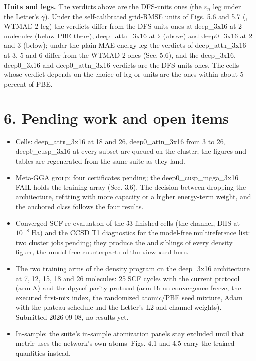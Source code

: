 \documentclass[10pt,a4paper]{article}
\begin{document}
\textbf{Units and legs.} The verdicts above are the DFS-units ones (the $\varepsilon_n$ leg under the Letter's $\gamma$). Under the self-calibrated grid-RMSE units of Figs. 5.6 and 5.7 (, WTMAD-2 leg) the verdicts differ from the DFS-units ones at deep\_3x16 at 2 molecules (below PBE there), deep\_attn\_3x16 at 2 (above) and deep0\_3x16 at 2 and 3 (below); under the plain-MAE energy leg the verdicts of deep\_attn\_3x16 at 3, 5 and 6 differ from the WTMAD-2 ones (Sec. 5.6), and the deep\_3x16, deep0\_3x16 and deep0\_attn\_3x16 verdicts are the DFS-units ones. The cells whose verdict depends on the choice of leg or units are the ones within about 5 percent of PBE.

\section*{6. Pending work and open items}

\begin{itemize}
\item Cells: deep\_attn\_3x16 at 18 and 26, deep0\_attn\_3x16 from 3 to 26, deep0\_cusp\_3x16 at every subset are queued on the cluster; the figures and tables are regenerated from the same suite as they land.
\item Meta-GGA group: four certificates pending; the deep0\_cusp\_mgga\_3x16 FAIL holds the training array (Sec. 3.6). The decision between dropping the architecture, refitting with more capacity or a higher energy-term weight, and the anchored class follows the four results.
\item Converged-SCF re-evaluation of the 33 finished cells (the  channel, DIIS at $10^{-8}$ Ha) and the CCSD T1 diagnostics for the model-free multireference list: two cluster jobs pending; they produce the  and  siblings of every density figure, the model-free counterparts of the  view used here.
\item The two training arms of the density program on the deep\_3x16 architecture at 7, 12, 15, 18 and 26 molecules: 25 SCF cycles with the current protocol (arm A) and the dpyscf-parity protocol (arm B: no convergence freeze, the executed first-mix index, the randomized atomic/PBE seed mixture, Adam with the plateau schedule and the Letter's L2 and channel weights). Submitted 2026-09-08, no results yet.
\item In-sample: the suite's in-sample atomization panels stay excluded until that metric uses the network's own atoms; Figs. 4.1 and 4.5 carry the trained quantities instead.
\end{itemize}
\end{document}

